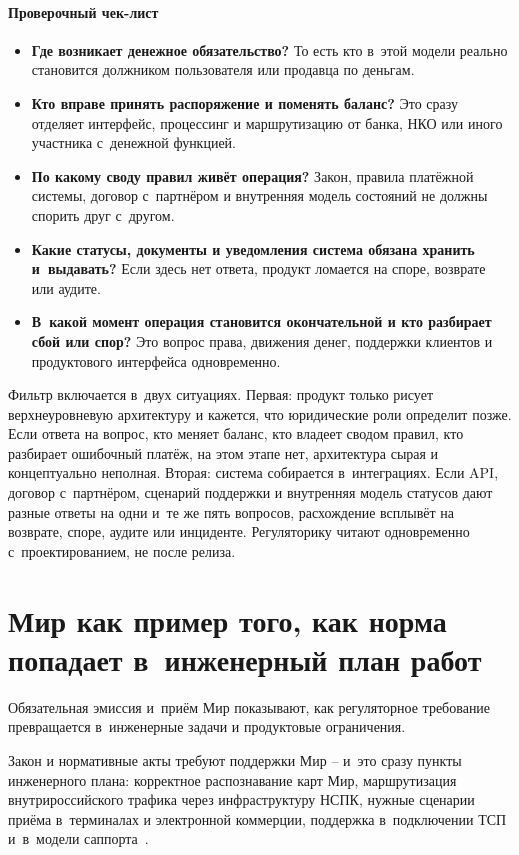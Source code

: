\paragraph{Проверочный чек-лист}
\begin{itemize}
  \item \textbf{Где возникает денежное обязательство?}
    То есть кто в~этой модели реально становится должником
    пользователя или продавца по деньгам.
  \item \textbf{Кто вправе принять распоряжение и поменять баланс?}
    Это сразу отделяет интерфейс, процессинг и маршрутизацию
    от банка, НКО или иного участника с~денежной функцией.
  \item \textbf{По какому своду правил живёт операция?}
    Закон, правила платёжной системы, договор с~партнёром
    и внутренняя модель состояний не должны спорить друг с~другом.
  \item \textbf{Какие статусы, документы и уведомления система
    обязана хранить и~выдавать?} Если здесь нет ответа,
    продукт ломается на споре,
    возврате или аудите.
  \item \textbf{В~какой момент операция становится окончательной
    и кто разбирает сбой или спор?} Это вопрос права,
    движения денег, поддержки клиентов
    и продуктового интерфейса одновременно.
\end{itemize}

Фильтр включается в~двух ситуациях.
Первая: продукт только рисует верхнеуровневую архитектуру и кажется, что юридические роли определит позже. Если ответа на вопрос, кто меняет баланс, кто владеет сводом правил, кто разбирает ошибочный платёж, на этом этапе нет, архитектура сырая и концептуально неполная.
Вторая: система собирается в~интеграциях. Если API, договор с~партнёром, сценарий поддержки и внутренняя модель статусов дают разные ответы на одни и~те же пять вопросов, расхождение всплывёт на возврате, споре, аудите или инциденте.
Регуляторику читают одновременно с~проектированием, не после релиза.

\section{Мир как пример того, как норма попадает в~инженерный план работ}\label{sec:regulation-mir-mandatory}

Обязательная эмиссия и~приём Мир показывают, как регуляторное требование превращается в~инженерные задачи и продуктовые ограничения.

Закон и нормативные акты требуют поддержки Мир -- и~это сразу пункты инженерного плана: корректное распознавание карт Мир, маршрутизация внутрироссийского трафика через инфраструктуру НСПК, нужные сценарии приёма в~терминалах и электронной коммерции, поддержка в~подключении ТСП и~в~модели саппорта~\cite{cbr-ps,cbr-nps-faq}.


